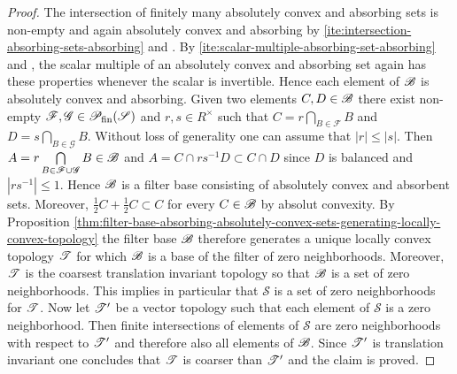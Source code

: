 \begin{proof}
  The intersection of finitely many absolutely convex and absorbing
  sets is non-empty and again absolutely convex and absorbing by
   \ref{ite:intersection-absorbing-sets-absorbing}
  and . 
  By 
  \ref{ite:scalar-multiple-absorbing-set-absorbing} and
  , the scalar multiple of an absolutely convex and absorbing set
  again has these properties whenever the scalar is invertible. 
  Hence each element of $\mathscr{B}$ is absolutely convex and absorbing. Given two elements $C,D\in \mathscr{B}$ there 
  exist non-empty $\mathscr{F},\mathscr{G}\in \mathscr{P}_\textup{fin}(\mathscr{S})$ and $r,s\in R^\times$
  such that $ C = r \bigcap\limits_{B \in \mathscr{F}} B $ and
  $D = s \bigcap\limits_{B \in \mathscr{G}} B$. Without loss of generality
  one can assume that $|r|\leq |s|$. Then
  $A= r  \bigcap\limits_{B \in \mathscr{F}\cup  \mathscr{G}} B \in \mathscr{B}$
  and $A  = C \cap rs^ {-1}D  \subset C \cap D$ since $D$ is balanced and $|rs^{-1}| \leq 1$.  
  Hence $\mathscr{B}$ is a filter base consisting of absolutely convex and absorbent
  sets. Moreover, $\frac 12 C + \frac 12 C\subset C $ for every $C \in \mathscr{B}$
  by absolut convexity.
  By Proposition \ref{thm:filter-base-absorbing-absolutely-convex-sets-generating-locally-convex-topology}
  the filter base $\mathscr{B}$ therefore generates
  a unique locally convex topology $\mathscr{T}$ for which  $\mathscr{B}$ is a base of the filter of zero
  neighborhoods. Moreover, $\mathscr{T}$ is the coarsest translation invariant topology so that $\mathscr{B}$ is a
  set of zero neighborhoods. This implies in particular that $\mathscr{S}$ is a set of zero
  neighborhoods for $\mathscr{T}$. Now let $\mathscr{T}'$ be a vector topology such that each
  element of $\mathscr{S}$ is a zero neighborhood. Then finite intersections of elements of 
  $\mathscr{S}$ are zero neighborhoods with respect to $\mathscr{T}'$ and therefore also
  all elements of $\mathscr{B}$. Since $\mathscr{T}'$ is translation invariant one concludes
  that  $\mathscr{T}$ is coarser than $\mathscr{T}'$ and the claim is proved.  
\end{proof}